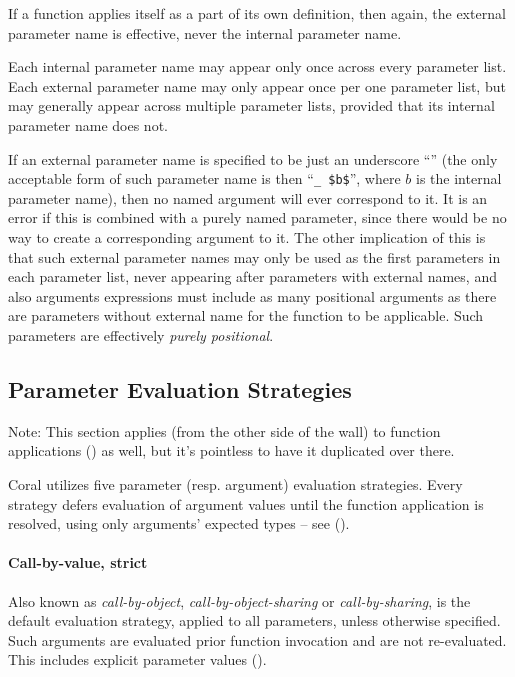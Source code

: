 If a function applies itself as a part of its own definition, then again, the external parameter name is effective, never the internal parameter name. 

Each internal parameter name may appear only once across every parameter list. Each external parameter name may only appear once per one parameter list, but may generally appear across multiple parameter lists, provided that its internal parameter name does not. 

If an external parameter name is specified to be just an underscore ``\code{_}'' (the only acceptable form of such parameter name is then ``\lstinline!_ $b$!'', where $b$ is the internal parameter name), then no named argument will ever correspond to it. It is an error if this is combined with a purely named parameter, since there would be no way to create a corresponding argument to it. The other implication of this is that such external parameter names may only be used as the first parameters in each parameter list, never appearing after parameters with external names, and also arguments expressions must include as many positional arguments as there are parameters without external name for the function to be applicable. Such parameters are effectively {\em purely positional}. 





\subsection{Parameter Evaluation Strategies}
\label{sec:param-eval-strategies}

Note: This section applies (from the other side of the wall) to function applications () as well, but it's pointless to have it duplicated over there. 

Coral utilizes five parameter (resp. argument) evaluation strategies. Every strategy defers evaluation of argument values until the function application is resolved, using only arguments' expected types -- see (). 

\paragraph{Call-by-value, strict}
Also known as {\em call-by-object}, {\em call-by-object-sharing} or {\em call-by-sharing}, is the default evaluation strategy, applied to all parameters, unless otherwise specified. Such arguments are evaluated prior function invocation and are not re-evaluated. This includes explicit parameter values ().

